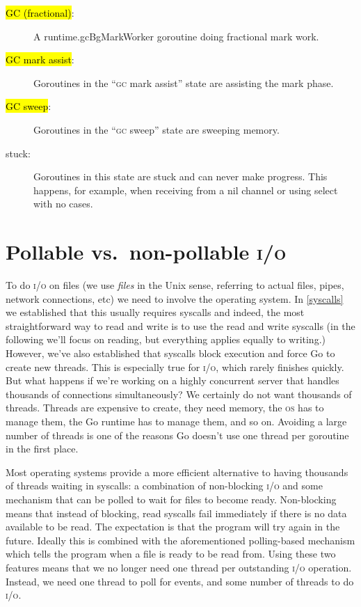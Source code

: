 \documentclass[10pt,letterpaper,oneside,openany,english]{memoir}
\newcommand{\code}[1]{{\ttfamily\mbox{#1}}}
\newcommand{\traceState}[2]{{\sethlcolor{#2}\hl{#1}}}
\begin{document}
\begin{description}
\item[\traceState{GC (fractional)}{stateGC}:] A \code{runtime.gcBgMarkWorker} goroutine doing fractional mark work.

\item[\traceState{GC mark assist}{stateGC}:] Goroutines in the \enquote{\textsc{gc} mark assist} state are assisting the mark phase.

\item[\traceState{GC sweep}{stateGC}:] Goroutines in the \enquote{\textsc{gc} sweep} state are sweeping memory.

\item[stuck:] Goroutines in this state are stuck and can never make progress.
  This happens, for example, when receiving from a nil channel or using \code{select} with no cases.

\end{description}

\section{Pollable vs.\ non-pollable \textsc{i/o}}\label{netpoller}

To do \textsc{i/o} on files (we use \emph{files} in the Unix sense, referring to actual files, pipes, network connections, etc) we need to involve the operating system.
In \cref{syscalls} we established that this usually requires syscalls and indeed, the most straightforward way to read and write is to use the \code{read} and \code{write} syscalls (in the following we'll focus on reading, but everything applies equally to writing.)
However, we've also established that syscalls block execution and force Go to create new threads.
This is especially true for \textsc{i/o}, which rarely finishes quickly.
But what happens if we're working on a highly concurrent server that handles thousands of connections simultaneously?
We certainly do not want thousands of threads.
Threads are expensive to create, they need memory, the \textsc{os} has to manage them, the Go runtime has to manage them, and so on.
Avoiding a large number of threads is one of the reasons Go doesn't use one thread per goroutine in the first place.

Most operating systems provide a more efficient alternative to having thousands of threads waiting in syscalls:
a combination of non-blocking \textsc{i/o} and some mechanism that can be polled to wait for files to become ready.
Non-blocking means that instead of blocking, read syscalls fail immediately if there is no data available to be read.
The expectation is that the program will try again in the future.
Ideally this is combined with the aforementioned polling-based mechanism which tells the program when a file is ready to be read from.
Using these two features means that we no longer need one thread per outstanding \textsc{i/o} operation. Instead, we need one thread to poll for events, and some number of threads to do \textsc{i/o}.
\end{document}
